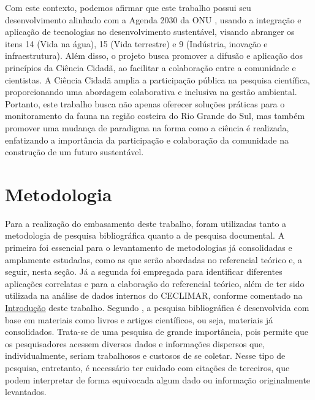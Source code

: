 Com este contexto, podemos afirmar que este trabalho possui seu desenvolvimento alinhado com a Agenda 2030 da ONU \cite{onu2015agenda2030}, usando a integração e aplicação de tecnologias no desenvolvimento sustentável, visando abranger os itens 14 (Vida na água), 15 (Vida terrestre) e 9 (Indústria, inovação e infraestrutura). Além disso, o projeto busca promover a difusão e aplicação dos princípios da Ciência Cidadã, ao facilitar a colaboração entre a comunidade e cientistas. A Ciência Cidadã amplia a participação pública na pesquisa científica, proporcionando uma abordagem colaborativa e inclusiva na gestão ambiental. Portanto, este trabalho busca não apenas oferecer soluções práticas para o monitoramento da fauna na região costeira do Rio Grande do Sul, mas também promover uma mudança de paradigma na forma como a ciência é realizada, enfatizando a importância da participação e colaboração da comunidade na construção de um futuro sustentável. 

\section{Metodologia}\label{metodologia}

Para a realização do embasamento deste trabalho, foram utilizadas tanto a metodologia de pesquisa bibliográfica 
quanto a de pesquisa documental. A primeira foi essencial para o levantamento de metodologias já consolidadas e 
amplamente estudadas, como as que serão abordadas no referencial teórico e, a seguir, nesta seção. Já a segunda 
foi empregada para identificar diferentes aplicações correlatas e para a elaboração do referencial teórico, além 
de ter sido utilizada na análise de dados internos do CECLIMAR, conforme comentado na 
\hyperref[chapter:intro]{Introdução} deste trabalho.
Segundo , a pesquisa bibliográfica é desenvolvida com base em materiais como livros 
e artigos científicos, ou seja, materiais já consolidados. Trata-se de uma pesquisa de grande importância, pois 
permite que os pesquisadores acessem diversos dados e informações dispersos que, individualmente, seriam 
trabalhosos e custosos de se coletar. Nesse tipo de pesquisa, entretanto, é necessário ter cuidado com citações 
de terceiros, que podem interpretar de forma equivocada algum dado ou informação originalmente levantados.

